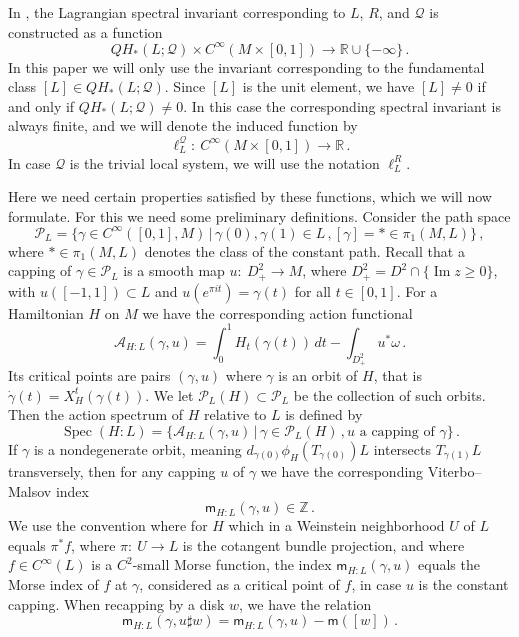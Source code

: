 \documentclass[11pt%
]{article}
\theoremstyle{definition}
\newcommand{\R}{{\mathbb{R}}}
\newcommand{\Z}{{\mathbb{Z}}}
\newcommand{\cA}{{\mathcal{A}}}
\newcommand{\cP}{{\mathcal{P}}}
\newcommand{\cQ}{{\mathcal{Q}}}
\newcommand{\fc}{{:\ }}
\DeclareMathOperator{\IM}{Im}
\DeclareMathOperator{\Spec}{Spec}
\DeclareMathOperator{\0}{\operatorname{\mathbf{0}}}
\begin{document}
In \cite{leclercq2018spectral}, the Lagrangian spectral invariant corresponding to $L$, $R$, and $\cQ$ is constructed as a function
$$QH_*(L;\cQ)\times C^\infty(M\times[0,1])\to\R\cup\{-\infty\}\,.$$
In this paper we will only use the invariant corresponding to the fundamental class $[L] \in QH_*(L;\cQ)$. Since $[L]$ is the unit element, we have $[L]\neq 0$ if and only if $QH_*(L;\cQ)\neq 0$. In this case the corresponding spectral invariant is always finite, and we will denote the induced function by
$$\ell^\cQ_L \fc C^\infty(M\times[0,1])\to \R\,.$$
In case $\cQ$ is the trivial local system, we will use the notation $\ell^R_L$.

Here we need certain properties satisfied by these functions, which we will now formulate. For this we need some preliminary definitions. Consider the path space
$$\cP_L = \{\gamma \in C^\infty([0,1],M)\,|\,\gamma(0),\gamma(1) \in L\,,[\gamma]=*\in\pi_1(M,L)\}\,,$$
where $* \in \pi_1(M,L)$ denotes the class of the constant path. Recall that a capping of $\gamma \in \cP_L$ is a smooth map $u \fc D^2_+ \to M$, where $D^2_+ = D^2\cap\{\IM z \geq 0\}$, with $u([-1,1])\subset L$ and $u(e^{\pi i t}) = \gamma(t)$ for all $t \in [0,1]$. For a Hamiltonian $H$ on $M$ we have the corresponding action functional
$$\cA_{H:L}(\gamma,u) = \int_0^1H_t(\gamma(t))\,dt - \int_{D^2_+}u^*\omega\,.$$
Its critical points are pairs $(\gamma,u)$ where $\gamma$ is an orbit of $H$, that is $\dot\gamma(t) = X^t_H(\gamma(t))$. We let $\cP_L(H) \subset \cP_L$ be the collection of such orbits. Then the action spectrum of $H$ relative to $L$ is defined by
$$\Spec(H:L) = \{\cA_{H:L}(\gamma,u)\,|\,\gamma \in \cP_L(H)\,,u\text{ a capping of }\gamma\}\,.$$
If $\gamma$ is a nondegenerate orbit, meaning $d_{\gamma(0)}\phi_H(T_{\gamma(0)})L$ intersects $T_{\gamma(1)}L$ transversely, then for any capping $u$ of $\gamma$ we have the corresponding Viterbo--Malsov index \cite{Viterbo_Intersection_Sous_Varietes_Lagrangiennes}
$$\mathsf m_{H:L}(\gamma,u) \in \Z\,.$$
We use the convention where for $H$ which in a Weinstein neighborhood $U$ of $L$ equals $\pi^*f$, where $\pi \fc U \to L$ is the cotangent bundle projection, and where $f \in C^\infty(L)$ is a $C^2$-small Morse function, the index $\mathsf m_{H:L}(\gamma,u)$ equals the Morse index of $f$ at $\gamma$, considered as a critical point of $f$, in case $u$ is the constant capping. When recapping by a disk $w$, we have the relation
$$\mathsf m_{H:L}(\gamma,u\sharp w) = \mathsf m_{H:L}(\gamma,u) - \mathsf m([w])\,.$$
\end{document}
